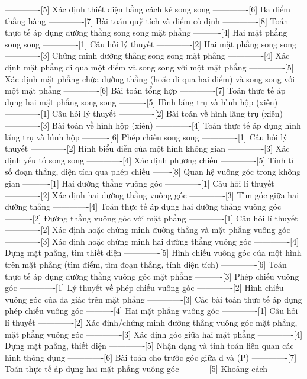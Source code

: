 -------------[5] Xác định thiết diện bằng cách kẻ song song
-------------[6] Ba điểm thẳng hàng
-------------[7] Bài toán quỹ tích và điểm cố định
-------------[8] Toán thực tế áp dụng đường thẳng song song mặt phẳng
----------[4] Hai mặt phẳng song song
-------------[1] Câu hỏi lý thuyết
-------------[2] Hai mặt phẳng song song
-------------[3] Chứng minh đường thẳng song song mặt phẳng
-------------[4] Xác định mặt phẳng đi qua một điểm và song song với một mặt phẳng
-------------[5] Xác định mặt phẳng chứa đường thẳng (hoặc đi qua hai điểm) và song song với một mặt phẳng
-------------[6] Bài toán tổng hợp
-------------[7] Toán thực tế áp dụng hai mặt phẳng song song
----------[5] Hình lăng trụ và hình hộp (xiên)
-------------[1] Câu hỏi lý thuyết
-------------[2] Bài toán về hình lăng trụ (xiên)
-------------[3] Bài toán về hình hộp (xiên)
-------------[4] Toán thực tế áp dụng hình lăng trụ và hình hộp
----------[6] Phép chiếu song song
-------------[1] Câu hỏi lý thuyết
-------------[2] Hình biểu diễn của một hình không gian
-------------[3] Xác định yếu tố song song
-------------[4] Xác định phương chiếu
-------------[5] Tính tỉ số đoạn thẳng, diện tích qua phép chiếu
-------[8] Quan hệ vuông góc trong không gian
----------[1] Hai đường thẳng vuông góc
-------------[1] Câu hỏi lí thuyết
-------------[2] Xác định hai đường thẳng vuông góc
-------------[3] Tìm góc giữa hai đường thẳng
-------------[4] Toán thực tế áp dụng hai đường thẳng vuông góc
----------[2] Đường thẳng vuông góc với mặt phẳng
-------------[1] Câu hỏi lí thuyết
-------------[2] Xác định hoặc chứng minh đường thẳng và mặt phẳng vuông góc
-------------[3] Xác định hoặc chứng minh hai đường thẳng vuông góc
-------------[4] Dựng mặt phẳng, tìm thiết diện
-------------[5] Hình chiếu vuông góc của một hình trên mặt phẳng (tìm điểm, tìm đoạn thẳng, tính diện tích)
-------------[6] Toán thực tế áp dụng đường thẳng vuông góc mặt phẳng
----------[3] Phép chiếu vuông góc
-------------[1] Lý thuyết về phép chiếu vuông góc
-------------[2] Hình chiếu vuông góc của đa giác trên mặt phẳng
-------------[3] Các bài toán thực tế áp dụng phép chiếu vuông góc
----------[4] Hai mặt phẳng vuông góc
-------------[1] Câu hỏi lí thuyết
-------------[2] Xác định/chứng minh đường thẳng vuông góc mặt phẳng, mặt phẳng vuông góc
-------------[3] Xác định góc giữa hai mặt phẳng
-------------[4] Dựng mặt phẳng, thiết diện
-------------[5] Nhận dạng và tính toán liên quan các hình thông dụng
-------------[6] Bài toán cho trước góc giữa d và (P)
-------------[7] Toán thực tế áp dụng hai mặt phẳng vuông góc
----------[5] Khoảng cách
